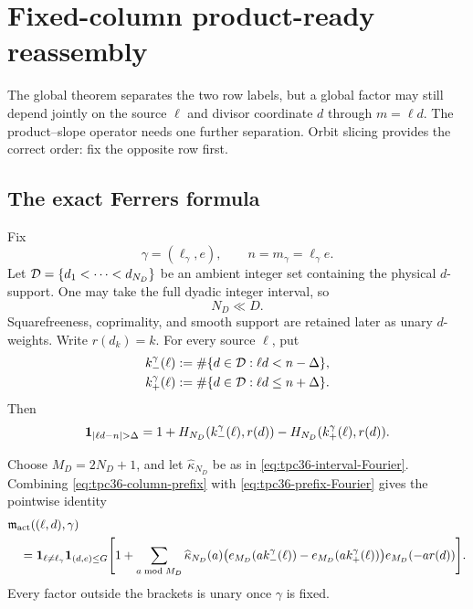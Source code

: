 \section{Fixed-column product-ready reassembly}
\label{sec:tpc36-fixed-column}

The global theorem separates the two row labels, but a global factor may
still depend jointly on the source \(\ell\) and divisor coordinate \(d\)
through \(m=\ell d\).  The product--slope operator needs one further
separation.  Orbit slicing provides the correct order: fix the opposite
row first.

\subsection{The exact Ferrers formula}

Fix
\begin{equation}
 \gamma=(\ell_\gamma,e),\qquad n=m_\gamma=\ell_\gamma e.
 \label{eq:tpc36-fixed-column}
\end{equation}
Let \(\mathcal D=\{d_1<\cdots<d_{N_D}\}\) be an ambient integer set containing
the physical \(d\)-support.  One may take the full dyadic integer interval,
so
\begin{equation}
 N_D\ll D.
 \label{eq:tpc36-divisor-count}
\end{equation}
Squarefreeness, coprimality, and smooth support are retained later as
unary \(d\)-weights.  Write \(r(d_k)=k\).  For every source \(\ell\), put
\begin{align}
 k_-^\gamma(\ell)
 &:=\#\{d\in\mathcal D:\ell d<n-\Delta\},
 \label{eq:tpc36-column-lower-rank}\\
 k_+^\gamma(\ell)
 &:=\#\{d\in\mathcal D:\ell d\le n+\Delta\}.
 \label{eq:tpc36-column-upper-rank}
\end{align}
Then
\begin{equation}
 \one_{|\ell d-n|>\Delta}
 =1+H_{N_D}(k_-^\gamma(\ell),r(d))
    -H_{N_D}(k_+^\gamma(\ell),r(d)).
 \label{eq:tpc36-column-prefix}
\end{equation}

Choose \(M_D=2N_D+1\), and let
\(\widehat\kappa_{N_D}\) be as in
\eqref{eq:tpc36-interval-Fourier}.  Combining
\eqref{eq:tpc36-column-prefix} with
\eqref{eq:tpc36-prefix-Fourier} gives the pointwise identity
\begin{align}
 &\mathfrak m_{\rm act}((\ell,d),\gamma)
 \notag\\
 &\quad=\mathbf 1_{\ell\ne\ell_\gamma}
 \mathbf 1_{(d,e)\le G}
 \Bigg[1+\sum_{a\bmod M_D}
 \widehat\kappa_{N_D}(a)
 \bigl(
 e_{M_D}(a k_-^\gamma(\ell))
 -e_{M_D}(a k_+^\gamma(\ell))
 \bigr)e_{M_D}(-a r(d))\Bigg].
 \label{eq:tpc36-exact-column-Fourier}
\end{align}
Every factor outside the brackets is unary once \(\gamma\) is fixed.

